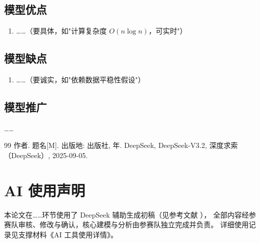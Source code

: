 \documentclass[UTF8,12pt,fontset=windows]{ctexart}
\begin{document}
\subsection{模型优点}
\begin{enumerate}
  \item ……（要具体，如"计算复杂度 $O(n\log n)$，可实时"）
\end{enumerate}

\subsection{模型缺点}
\begin{enumerate}
  \item ……（要诚实，如"依赖数据平稳性假设"）
\end{enumerate}

\subsection{模型推广}
……

\begin{thebibliography}{99}
   作者. 题名[M]. 出版地: 出版社, 年.
   DeepSeek, DeepSeek-V3.2, 深度求索（DeepSeek）, 2025-09-05.
\end{thebibliography}

\section*{AI 使用声明}

本论文在……环节使用了 DeepSeek 辅助生成初稿（见参考文献 \cite{ai1}），
全部内容经参赛队审核、修改与确认，核心建模与分析由参赛队独立完成并负责。
详细使用记录见支撑材料《AI 工具使用详情》。

\newpage
\appendix
\end{document}
